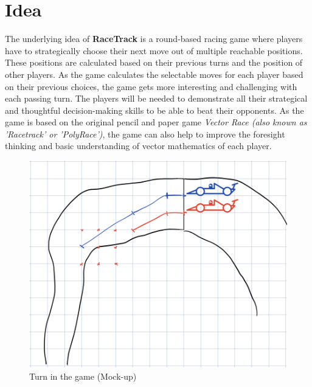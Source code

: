 \section{Idea}
	The underlying idea of \textbf{RaceTrack} is a round-based racing game where players have to strategically choose their next move out of multiple reachable positions. These positions are calculated based on their previous turns and the position of other players. As the game calculates the selectable moves for each player based on their previous choices, the game gets more interesting and challenging with each passing turn. The players will be needed to demonstrate all their strategical and thoughtful decision-making skills to be able to beat their opponents. As the game is based on the original pencil and paper game \textit{Vector Race (also known as 'Racetrack' or 'PolyRace')}, the game can also help to improve the foresight thinking and basic understanding of vector mathematics of each player.

	\begin{figure}[H]
		\centering
		\includegraphics[width=14cm,keepaspectratio,center]{img/RaceTrack_Draft.png}
		\caption{Turn in the game (Mock-up)}
	\end{figure}